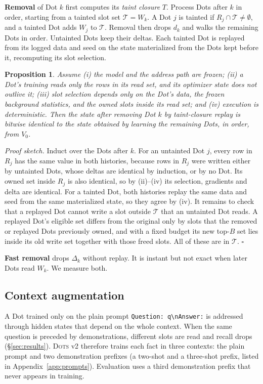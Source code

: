 \documentclass[11pt]{article}
\newtheorem{proposition}{Proposition}
\newcommand{\sys}{\textsc{Dots}}
\begin{document}
\textbf{Removal} of Dot $k$ first computes its \emph{taint closure} $T$. Process Dots after $k$ in order, starting from a tainted slot set $\mathcal{T} = W_k$. A Dot $j$ is tainted if $R_j \cap \mathcal{T} \neq \emptyset$, and a tainted Dot adds $W_j$ to $\mathcal{T}$. Removal then drops $d_k$ and walks the remaining Dots in order. Untainted Dots keep their deltas. Each tainted Dot is replayed from its logged data and seed on the state materialized from the Dots kept before it, recomputing its slot selection.

\begin{proposition}
\label{prop:exact}
Assume (i) the model and the address path are frozen; (ii) a Dot's training reads only the rows in its read set, and its optimizer state does not outlive it; (iii) slot selection depends only on the Dot's data, the frozen background statistics, and the owned slots inside its read set; and (iv) execution is deterministic. Then the state after removing Dot $k$ by taint-closure replay is bitwise identical to the state obtained by learning the remaining Dots, in order, from $V_0$.
\end{proposition}

\noindent\emph{Proof sketch.} Induct over the Dots after $k$. For an untainted Dot $j$, every row in $R_j$ has the same value in both histories, because rows in $R_j$ were written either by untainted Dots, whose deltas are identical by induction, or by no Dot. Its owned set inside $R_j$ is also identical, so by (ii)--(iv) its selection, gradients and delta are identical. For a tainted Dot, both histories replay the same data and seed from the same materialized state, so they agree by (iv). It remains to check that a replayed Dot cannot write a slot outside $\mathcal{T}$ that an untainted Dot reads. A replayed Dot's eligible set differs from the original only by slots that the removed or replayed Dots previously owned, and with a fixed budget its new top-$B$ set lies inside its old write set together with those freed slots. All of these are in $\mathcal{T}$. $\square$

\textbf{Fast removal} drops $\Delta_k$ without replay. It is instant but not exact when later Dots read $W_k$. We measure both.

\subsection{Context augmentation}
\label{sec:aug}

A Dot trained only on the plain prompt \texttt{Question: q\textbackslash nAnswer:} is addressed through hidden states that depend on the whole context. When the same question is preceded by demonstrations, different slots are read and recall drops (\S\ref{sec:results}). \sys{} v2 therefore trains each fact in three contexts: the plain prompt and two demonstration prefixes (a two-shot and a three-shot prefix, listed in Appendix~\ref{app:prompts}). Evaluation uses a third demonstration prefix that never appears in training.
\end{document}
